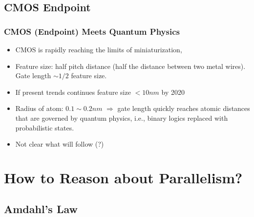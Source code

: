 \documentclass{beamer}
\begin{document}
\subsection{CMOS Endpoint}
\begin{frame}[fragile,t]
\frametitle{CMOS (Endpoint) Meets Quantum Physics}

\begin{itemize}
    \item CMOS is rapidly reaching the limits of miniaturization,\medskip

    \item Feature size: half pitch distance (half the distance between
            two metal wires). Gate length $\sim 1/2$ feature size.\medskip

    \item If present trends continues feature size $< 10 nm$ by 2020\medskip

    \item Radius of atom: $0.1 \sim 0.2 nm$ $\Rightarrow$ gate length quickly
            reaches atomic distances that are governed by quantum physics,
            i.e., binary logics replaced with probabilistic states.\medskip

    \item Not clear what will follow (?)
\end  {itemize}
\end{frame}


\section{How to Reason about Parallelism?}

\begin{frame}[fragile]
	\tableofcontents[currentsection]
\end{frame}

\subsection{Amdahl's Law}
\end{document}
